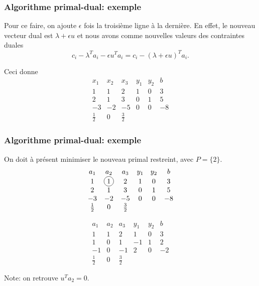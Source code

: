 \documentclass[t, aspectratio=169, usepdftitle=false]{beamer}
\newcommand*\circled[1]{\tikz[baseline=(char.base)]{
    \node[shape=circle,draw,inner sep=2pt] (char) {#1};}}
\begin{document}
\begin{frame}
\frametitle{Algorithme primal-dual: exemple}

Pour ce faire, on ajoute $\epsilon$ fois la troisième ligne à la dernière.
En effet, le nouveau vecteur dual est $\lambda+\epsilon u$ et nous avons comme nouvelles valeurs des contraintes duales
$$
c_i - \lambda^T a_i - \epsilon u^T a_i = c_i - (\lambda + \epsilon u)^Ta_i. 
$$

\mbox{}

Ceci donne
$$
\begin{matrix}
x_1 & x_2 & x_3 & y_1 & y_2 & b \\
1 & 1 & 2 & 1 & 0 & 3 \\
2 & 1 & 3 & 0 & 1 & 5 \\
-3 & -2 & -5 & 0 & 0 & -8 \\
\frac{1}{2} & 0 & \frac{3}{2}
\end{matrix}
$$

\end{frame}

\begin{frame}
\frametitle{Algorithme primal-dual: exemple}

On doit à présent minimiser le nouveau primal restreint, avec $P = \lbrace 2 \rbrace$.
\[
\begin{matrix}
a_1 & a_2 & a_3 & y_1 & y_2 & b \\
1 & \circled{1} & 2 & 1 & 0 & 3 \\
2 & 1 & 3 & 0 & 1 & 5 \\
-3 & -2 & -5 & 0 & 0 & -8 \\
\frac{1}{2} & 0 & \frac{3}{2}
\end{matrix}
\]

\mbox{}

\[
\begin{matrix}
a_1 & a_2 & a_3 & y_1 & y_2 & b \\
1 & 1 & 2 & 1 & 0 & 3 \\
1 & 0 & 1 & -1 & 1 & 2 \\
-1 & 0 & -1 & 2 & 0 & -2 \\
\frac{1}{2} & 0 & \frac{3}{2}
\end{matrix}
\]

Note: on retrouve $u^T a_2 = 0$.
\end{frame}
\end{document}
